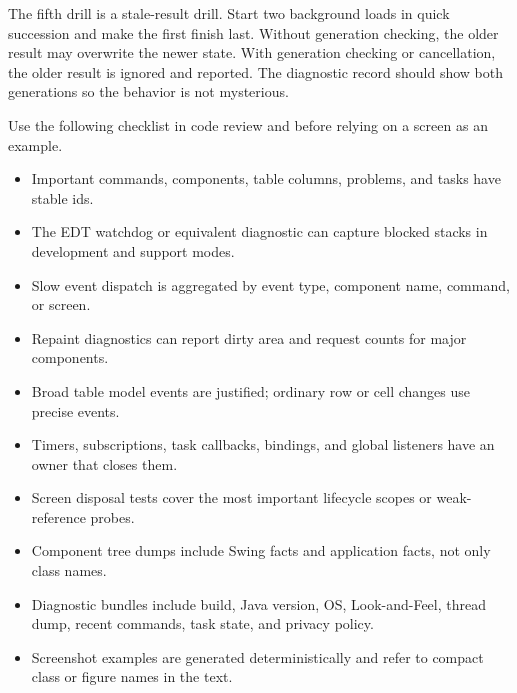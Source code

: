 The fifth drill is a stale-result drill. Start two background loads in quick succession and make the first finish last. Without generation checking, the older result may overwrite the newer state. With generation checking or cancellation, the older result is ignored and reported. The diagnostic record should show both generations so the behavior is not mysterious.

Use the following checklist in code review and before relying on a screen as an example.

\begin{itemize}
\item Important commands, components, table columns, problems, and tasks have stable ids.
\item The EDT watchdog or equivalent diagnostic can capture blocked stacks in development and support modes.
\item Slow event dispatch is aggregated by event type, component name, command, or screen.
\item Repaint diagnostics can report dirty area and request counts for major components.
\item Broad table model events are justified; ordinary row or cell changes use precise events.
\item Timers, subscriptions, task callbacks, bindings, and global listeners have an owner that closes them.
\item Screen disposal tests cover the most important lifecycle scopes or weak-reference probes.
\item Component tree dumps include Swing facts and application facts, not only class names.
\item Diagnostic bundles include build, Java version, OS, Look-and-Feel, thread dump, recent commands, task state, and privacy policy.
\item Screenshot examples are generated deterministically and refer to compact class or figure names in the text.
\end{itemize}

